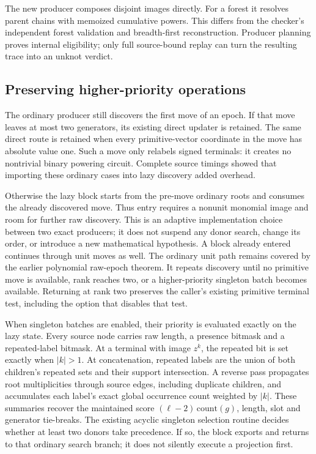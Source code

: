 The new producer composes disjoint images directly. For a forest it resolves
parent chains with memoized cumulative powers. This differs from the checker's
independent forest validation and breadth-first reconstruction. Producer
planning proves internal eligibility; only full source-bound replay can turn
the resulting trace into an unknot verdict.

\subsection{Preserving higher-priority operations}

The ordinary producer still discovers the first move of an epoch. If that
move leaves at most two generators, its existing direct updater is retained.
The same direct route is retained when every primitive-vector coordinate in
the move has absolute value one. Such a move only relabels signed terminals:
it creates no nontrivial binary powering circuit. Complete source timings
showed that importing these ordinary cases into lazy discovery added overhead.

Otherwise the lazy block starts from the pre-move ordinary roots and consumes
the already discovered move. Thus entry requires a nonunit monomial image
and room for further raw discovery. This is an adaptive implementation choice
between two exact producers; it does not suspend any donor search, change
its order, or introduce a new mathematical hypothesis. A block already entered
continues through unit moves as well. The ordinary unit path remains covered
by the earlier polynomial raw-epoch theorem. It repeats discovery until no primitive move
is available, rank reaches two, or a higher-priority singleton batch becomes
available. Returning at rank two preserves the caller's existing primitive
terminal test, including the option that disables that test.

When singleton batches are enabled, their priority is evaluated exactly on
the lazy state. Every source node carries raw length, a presence bitmask and
a repeated-label bitmask. At a terminal with image $z^k$, the repeated bit is
set exactly when $|k|>1$. At concatenation, repeated labels are the union of
both children's repeated sets and their support intersection. A reverse pass
propagates root multiplicities through source edges, including duplicate
children, and accumulates each label's exact global occurrence count weighted
by $|k|$. These summaries recover the maintained score
$(\ell-2)\,\mathrm{count}(g)$, length, slot and generator tie-breaks.
The existing acyclic singleton selection routine decides whether at least
two donors take precedence. If so, the block exports and returns to that
ordinary search branch; it does not silently execute a projection first.

